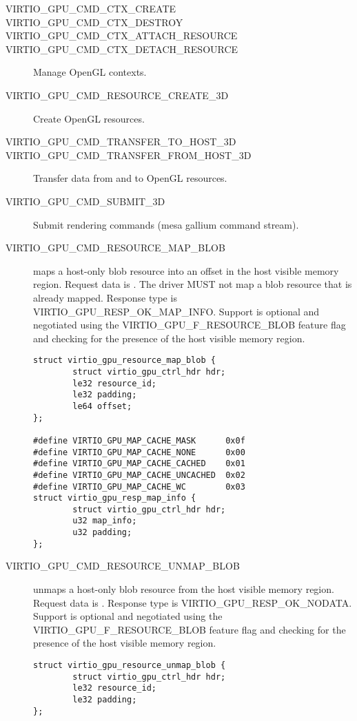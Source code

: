 \begin{description}

\item[VIRTIO_GPU_CMD_CTX_CREATE]
\item[VIRTIO_GPU_CMD_CTX_DESTROY]
\item[VIRTIO_GPU_CMD_CTX_ATTACH_RESOURCE]
\item[VIRTIO_GPU_CMD_CTX_DETACH_RESOURCE]
  Manage OpenGL contexts.

\item[VIRTIO_GPU_CMD_RESOURCE_CREATE_3D]
  Create OpenGL resources.

\item[VIRTIO_GPU_CMD_TRANSFER_TO_HOST_3D]
\item[VIRTIO_GPU_CMD_TRANSFER_FROM_HOST_3D]
  Transfer data from and to OpenGL resources.

\item[VIRTIO_GPU_CMD_SUBMIT_3D]
  Submit rendering commands (mesa gallium command stream).

\item[VIRTIO_GPU_CMD_RESOURCE_MAP_BLOB] maps a host-only
  blob resource into an offset in the host visible memory region. Request
  data is .  The driver MUST
  not map a blob resource that is already mapped.  Response type is
  VIRTIO_GPU_RESP_OK_MAP_INFO. Support is optional and negotiated
  using the VIRTIO_GPU_F_RESOURCE_BLOB feature flag and checking for
  the presence of the host visible memory region.

\begin{lstlisting}
struct virtio_gpu_resource_map_blob {
        struct virtio_gpu_ctrl_hdr hdr;
        le32 resource_id;
        le32 padding;
        le64 offset;
};

#define VIRTIO_GPU_MAP_CACHE_MASK      0x0f
#define VIRTIO_GPU_MAP_CACHE_NONE      0x00
#define VIRTIO_GPU_MAP_CACHE_CACHED    0x01
#define VIRTIO_GPU_MAP_CACHE_UNCACHED  0x02
#define VIRTIO_GPU_MAP_CACHE_WC        0x03
struct virtio_gpu_resp_map_info {
        struct virtio_gpu_ctrl_hdr hdr;
        u32 map_info;
        u32 padding;
};
\end{lstlisting}

\item[VIRTIO_GPU_CMD_RESOURCE_UNMAP_BLOB] unmaps a
  host-only blob resource from the host visible memory region. Request data
  is .  Response type is
  VIRTIO_GPU_RESP_OK_NODATA.  Support is optional and negotiated
  using the VIRTIO_GPU_F_RESOURCE_BLOB feature flag and checking for
  the presence of the host visible memory region.

\begin{lstlisting}
struct virtio_gpu_resource_unmap_blob {
        struct virtio_gpu_ctrl_hdr hdr;
        le32 resource_id;
        le32 padding;
};
\end{lstlisting}

\end{description}

